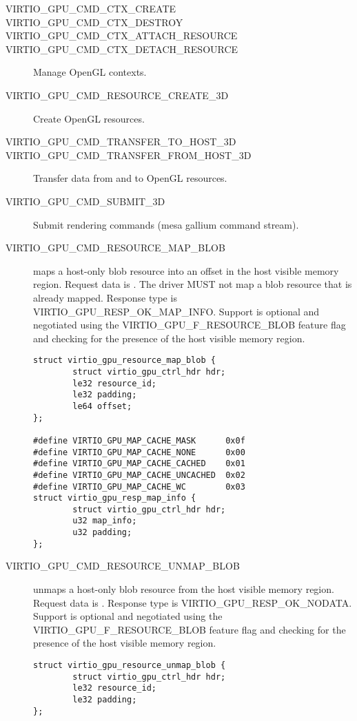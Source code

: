 \begin{description}

\item[VIRTIO_GPU_CMD_CTX_CREATE]
\item[VIRTIO_GPU_CMD_CTX_DESTROY]
\item[VIRTIO_GPU_CMD_CTX_ATTACH_RESOURCE]
\item[VIRTIO_GPU_CMD_CTX_DETACH_RESOURCE]
  Manage OpenGL contexts.

\item[VIRTIO_GPU_CMD_RESOURCE_CREATE_3D]
  Create OpenGL resources.

\item[VIRTIO_GPU_CMD_TRANSFER_TO_HOST_3D]
\item[VIRTIO_GPU_CMD_TRANSFER_FROM_HOST_3D]
  Transfer data from and to OpenGL resources.

\item[VIRTIO_GPU_CMD_SUBMIT_3D]
  Submit rendering commands (mesa gallium command stream).

\item[VIRTIO_GPU_CMD_RESOURCE_MAP_BLOB] maps a host-only
  blob resource into an offset in the host visible memory region. Request
  data is .  The driver MUST
  not map a blob resource that is already mapped.  Response type is
  VIRTIO_GPU_RESP_OK_MAP_INFO. Support is optional and negotiated
  using the VIRTIO_GPU_F_RESOURCE_BLOB feature flag and checking for
  the presence of the host visible memory region.

\begin{lstlisting}
struct virtio_gpu_resource_map_blob {
        struct virtio_gpu_ctrl_hdr hdr;
        le32 resource_id;
        le32 padding;
        le64 offset;
};

#define VIRTIO_GPU_MAP_CACHE_MASK      0x0f
#define VIRTIO_GPU_MAP_CACHE_NONE      0x00
#define VIRTIO_GPU_MAP_CACHE_CACHED    0x01
#define VIRTIO_GPU_MAP_CACHE_UNCACHED  0x02
#define VIRTIO_GPU_MAP_CACHE_WC        0x03
struct virtio_gpu_resp_map_info {
        struct virtio_gpu_ctrl_hdr hdr;
        u32 map_info;
        u32 padding;
};
\end{lstlisting}

\item[VIRTIO_GPU_CMD_RESOURCE_UNMAP_BLOB] unmaps a
  host-only blob resource from the host visible memory region. Request data
  is .  Response type is
  VIRTIO_GPU_RESP_OK_NODATA.  Support is optional and negotiated
  using the VIRTIO_GPU_F_RESOURCE_BLOB feature flag and checking for
  the presence of the host visible memory region.

\begin{lstlisting}
struct virtio_gpu_resource_unmap_blob {
        struct virtio_gpu_ctrl_hdr hdr;
        le32 resource_id;
        le32 padding;
};
\end{lstlisting}

\end{description}

